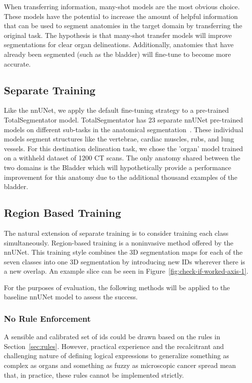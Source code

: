 \documentclass[12pt,twoside]{report}
\begin{document}
When transferring information, many-shot models are the most obvious choice. These models have the potential to increase the amount of helpful information that can be used to segment anatomies in the target domain by transferring the original task. The hypothesis is that many-shot transfer models will improve segmentations for clear organ delineations. Additionally, anatomies that have already been segmented (such as the bladder) will fine-tune to become more accurate.

\subsection{Separate Training}

Like the nnUNet, we apply the default fine-tuning strategy to a pre-trained TotalSegmentator model. TotalSegmentator has 23 separate nnUNet pre-trained models on different sub-tasks in the anatomical segmentation~\cite{totalsegmentor-git}. These individual models segment structures like the vertebrae, cardiac muscles, rubs, and lung vessels. For this destination delineation task, we chose the 'organ' model trained on a withheld dataset of 1200 CT scans. The only anatomy shared between the two domains is the Bladder which will hypothetically provide a performance improvement for this anatomy due to the additional thousand examples of the bladder.

\subsection{Region Based Training}

The natural extension of separate training is to consider training each class simultaneously. Region-based training is a noninvasive method offered by the nnUNet. This training style combines the 3D segmentation maps for each of the seven classes into one 3D segmentation by introducing new IDs wherever there is a new overlap. An example slice can be seen in Figure~\ref{fig:check-if-worked-axis-1}.

For the purposes of evaluation, the following methods will be applied to the baseline nnUNet model to assess the success.

\subsubsection{No Rule Enforcement}

A sensible and calibrated set of ids could be drawn based on the rules in Section~\ref{sec:rules}. However, practical experience and the recalcitrant and challenging nature of defining logical expressions to generalize something as complex as organs and something as fuzzy as microscopic cancer spread mean that, in practice, these rules cannot be implemented strictly.
\end{document}
